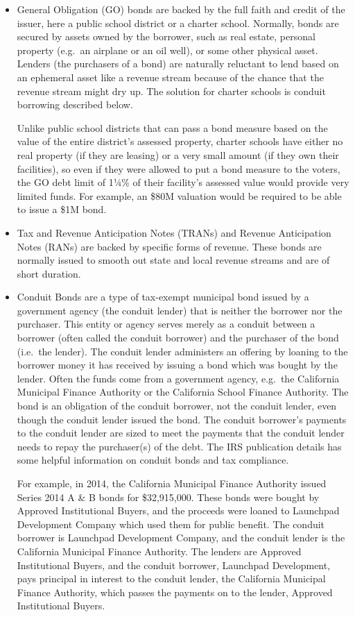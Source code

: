 \begin{itemize}
  \item General Obligation (GO) bonds are backed by the full faith and credit of the issuer, here a public school district or a charter school. Normally, bonds are secured by assets owned by the borrower, such as real estate, personal property (e.g.\ an airplane or an oil well), or some other physical asset. Lenders (the purchasers of a bond) are naturally reluctant to lend based on an ephemeral asset like a revenue stream because of the chance that the revenue stream might dry up. The solution for charter schools is conduit borrowing described below.

  Unlike public school districts that can pass a bond measure based on the value of the entire district's assessed property, charter schools have either no real property (if they are leasing) or a very small amount (if they own their facilities), so even if they were allowed to put a bond measure to the voters, the GO debt limit of 1¼\% of their facility's assessed value would provide very limited funds. For example, an \$80M valuation would be required to be able to issue a \$1M bond. 

  \item Tax and Revenue Anticipation Notes (TRANs) and Revenue Anticipation Notes (RANs) are backed by specific forms of revenue. These bonds are normally issued to smooth out state and local revenue streams and are of short duration.
  
  \item Conduit Bonds are a type of tax-exempt municipal bond issued by a government agency (the conduit lender) that is neither the borrower nor the purchaser. This entity or agency serves merely as a conduit between a borrower (often called the conduit borrower) and the purchaser of the bond (i.e.~the lender). The conduit lender administers an offering by loaning to the borrower money it has received by issuing a bond which was bought by the lender. Often the funds come from a government agency, e.g.~the California Municipal Finance Authority or the California School Finance Authority. The bond is an obligation of the conduit borrower, not the conduit lender, even though the conduit lender issued the bond. The conduit borrower's payments to the conduit lender are sized to meet the payments that the conduit lender needs to repay the purchaser(s) of the debt. The IRS publication  details has some helpful information on conduit bonds and tax compliance.

For example, in 2014, the California Municipal Finance Authority issued Series 2014 A \& B bonds for \$32,915,000. These bonds were bought by Approved Institutional Buyers, and the proceeds were loaned to Launchpad Development Company which used them for public benefit. The conduit borrower is Launchpad Development Company, and the conduit lender is the California Municipal Finance Authority. The lenders are Approved Institutional Buyers, and the conduit borrower, Launchpad Development, pays principal in interest to the conduit lender, the California Municipal Finance Authority, which passes the payments on to the lender, Approved Institutional Buyers.
\end{itemize}
